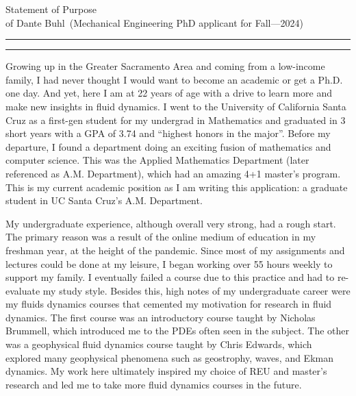 \documentclass{article}
\newcommand{\soptitle}{Statement of Purpose}
\newcommand{\yourname}{Dante Buhl}
\begin{document}
\begin{center}\LARGE\soptitle\\
\large of \yourname\ (Mechanical Engineering PhD applicant for Fall---2024)
\end{center}

\hrule
\vspace{1pt}
\hrule height 1pt

\bigskip

\large
Growing up in the Greater Sacramento Area and coming from a low-income family, I had never thought I would want to become an academic or get a Ph.D. one day. And yet, here I am at 22 years of age with a drive to learn more and make new insights in fluid dynamics. I went to the University of California Santa Cruz as a first-gen student for my undergrad in Mathematics and graduated in 3 short years with a GPA of 3.74 and ``highest honors in the major''. Before my departure, I found a department doing an exciting fusion of mathematics and computer science. This was the Applied Mathematics Department (later referenced as A.M. Department), which had an amazing 4+1 master's program. This is my current academic position as I am writing this application: a graduate student in UC Santa Cruz's A.M. Department. 

My undergraduate experience, although overall very strong, had a rough start. The primary reason was a result of the online medium of education in my freshman year, at the height of the pandemic. Since most of my assignments and lectures could be done at my leisure, I began working over 55 hours weekly to support my family. I eventually failed a course due to this practice and had to re-evaluate my study style. Besides this, high notes of my undergraduate career were my fluids dynamics courses that cemented my motivation for research in fluid dynamics. The first course was an introductory course taught by Nicholas Brummell, which introduced me to the PDEs often seen in the subject. The other was a geophysical fluid dynamics course taught by Chris Edwards, which explored many geophysical phenomena such as geostrophy, waves, and Ekman dynamics. My work here ultimately inspired my choice of REU and master's research and led me to take more fluid dynamics courses in the future. 
\end{document}
